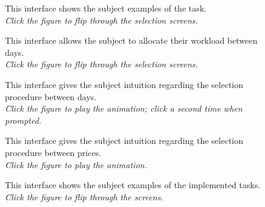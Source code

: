 \documentclass[letterpaper,DIV=14]{scrartcl}
\begin{document}
\begin{figure}[p]
\centering{}
\caption{This interface shows the subject examples of the task.\\\emph{Click the figure to flip through the selection screens.}}
\end{figure}

\begin{figure}[p]
\centering{}
\caption{This interface allows the subject to allocate their workload between days.\\\emph{Click the figure to flip through the selection screens.}}
\end{figure}

\begin{figure}[p]
\centering{}
\caption{This interface gives the subject intuition regarding the selection procedure between days.\\ \emph{Click the figure to play the animation; click a second time when prompted.}}
\end{figure}

\begin{figure}[p]
\centering{}
\caption{This interface gives the subject intuition regarding the selection procedure between prices.\\ \emph{Click the figure to play the animation.}}
\end{figure}

\begin{figure}[p]
\centering{}
\caption{This interface shows the subject examples of the implemented tasks.\\\emph{Click the figure to flip through the screens.}}
\end{figure}
\end{document}
